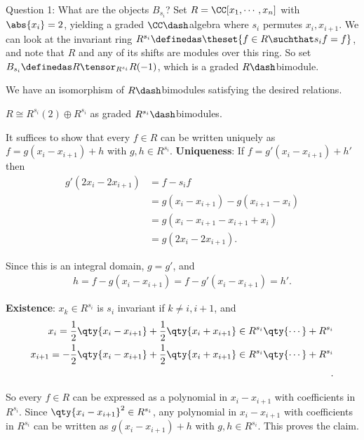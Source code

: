 Question 1: What are the objects \(B_{s_i}\)? Set
\(R = \CC[x_1, \cdots, x_n]\) with \(\abs{x_i} = 2\), yielding a graded
\(\CC\dash\)algebra where \(s_i\) permutes \(x_i, x_{i+1}\). We can look
at the invariant ring
\(R^{s_i} \definedas \theset{f\in R \suchthat s_i f = f}\), and note
that \(R\) and any of its shifts are modules over this ring. So set
\(B_{s_i} \definedas R \tensor_{R^{s_i}} R(-1)\), which is a graded
\(R\dash\)bimodule.

\begin{description}
\tightlist
\item[Proposition]
We have an isomorphism of \(R\dash\)bimodules satisfying the desired
relations.
\item[Claim]
\(R\cong R^{s_i}(2) \oplus R^{s_i}\) as graded
\(R^{s_i}\dash\)bimodules.
\end{description}

It suffices to show that every \(f\in R\) can be written uniquely as
\(f = g(x_i - x_{i+1}) + h\) with \(g, h \in R^{s_i}\).
\textbf{Uniqueness}: If \(f =g'(x_i - x_{i+1}) + h'\) then
\begin{align*}
g'(2x_i - 2x_{i+1}) 
&= f - s_i f \\
&= g(x_i - x_{i+1}) - g(x_{i+1} - x_i)  \\
&= g(x_i - x_{i+1} - x_{i+1} + x_i) \\
&= g(2x_i - 2x_{i+1})
.\end{align*}

Since this is an integral domain, \(g=g'\), and \begin{align*}
h = f - g (x_i - x_{i+1}) = f - g'(x_i - x_{i+1}) = h'
.\end{align*}

\textbf{Existence}: \(x_k \in R^{s_i}\) is \(s_i\) invariant if
\(k\neq i, i+1\), and \begin{align*}
x_i = {1\over 2}\qty{ x_i - x_{i+1}} + {1\over 2}\qty{x_i + x_{i+1}} \in R^{s_i} \qty{\cdots} + R^{s_i}  \\
x_{i+1} = -{1\over 2}\qty{ x_i - x_{i+1}} + {1\over 2}\qty{x_i + x_{i+1}} \in R^{s_i} \qty{\cdots} + R^{s_i}  \\
.\end{align*}

So every \(f\in R\) can be expressed as a polynomial in
\(x_i - x_{i+1}\) with coefficients in \(R^{s_i}\). Since
\(\qty{x_i - x_{i+1}}^2 \in R^{s_i}\), any polynomial in
\(x_i - x_{i+1}\) with coefficients in \(R^{s_i}\) can be written as
\(g(x_i - x_{i+1}) + h\) with \(g, h \in R^{s_i}\). This proves the
claim.

